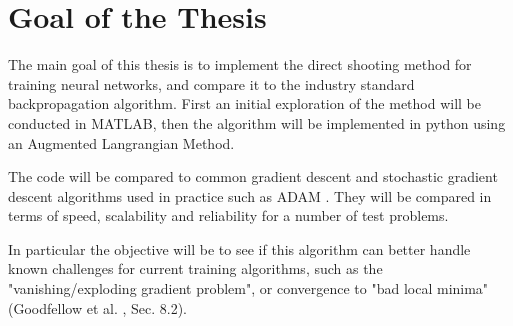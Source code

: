 \section{Goal of the Thesis}

The main goal of this thesis is to implement the direct shooting method for training neural networks, and compare it to the industry standard backpropagation algorithm. First an initial exploration of the method will be conducted in MATLAB, then the algorithm will be implemented in python using an Augmented Langrangian Method.

The code will be compared to common gradient descent and stochastic gradient descent algorithms used in practice such as ADAM \cite{kingma2017adam}. They will be compared in terms of speed, scalability and reliability for a number of test problems.

In particular the objective will be to see if this algorithm can better handle known challenges for current training algorithms, such as the "vanishing/exploding gradient problem", or convergence to "bad local minima" (Goodfellow et al. \cite{Goodfellow-et-al-2016}, Sec. 8.2).



